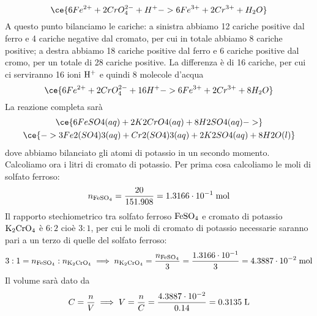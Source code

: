 \begin{soluzione}
    \begin{equation*}
        \ce{6Fe^{2+} + 2CrO_4^{2-} + H^+ -> 6Fe^{3+} + 2Cr^{3+} + H_2O}
    \end{equation*}
    A questo punto bilanciamo le cariche: a sinistra abbiamo 12 cariche positive dal ferro e 4 cariche negative dal cromato, per cui in totale abbiamo 8 cariche positive; a destra abbiamo 18 cariche positive dal ferro e 6 cariche positive dal cromo, per un totale di 28 cariche positive. La differenza è di 16 cariche, per cui ci serviranno 16 ioni $\rm H^+$ e quindi 8 molecole d'acqua
    \begin{equation*}
        \ce{6Fe^{2+} + 2CrO_4^{2-} + 16H^+ -> 6Fe^{3+} + 2Cr^{3+} + 8H_2O}
    \end{equation*}
    La reazione completa sarà
    \begin{gather*}
        \ce{6FeSO4(aq) + 2K2CrO4(aq) + 8H2SO4(aq) ->}
        \\
        \ce{-> 3Fe2(SO4)3(aq) + Cr2(SO4)3(aq) + 2K2SO4(aq) + 8H2O(l)}
    \end{gather*}
    dove abbiamo bilanciato gli atomi di potassio in un secondo momento.\\
    Calcoliamo ora i litri di cromato di potassio. Per prima cosa calcoliamo le moli di solfato ferroso:
    \begin{equation*}
        n_{\rm FeSO_4}=\frac{20}{151.908}
        =1.3166 \cdot 10^{-1} \; \rm mol
    \end{equation*}
    Il rapporto stechiometrico tra solfato ferroso $\rm FeSO_4$ e cromato di potassio $\rm K_2CrO_4$ è $6:2$ cioè $3:1$, per cui le moli di cromato di potassio necessarie saranno pari a un terzo di quelle del solfato ferroso:
    \begin{equation*}
        3:1=n_{\rm FeSO_4}:n_{\rm K_2CrO_4}
        \implies
        n_{\rm K_2CrO_4}
        =\frac{n_{\rm FeSO_4}}{3}
        =\frac{1.3166 \cdot 10^{-1}}{3}
        =4.3887 \cdot 10^{-2} \; \rm mol
    \end{equation*}
    Il volume sarà dato da
    \begin{equation*}
        C=\frac{n}{V}
        \implies
        V=\frac{n}{C}
        =\frac{4.3887 \cdot 10^{-2}}{0.14}=0.3135 \; \rm L
    \end{equation*}
\end{soluzione}

\newpage


